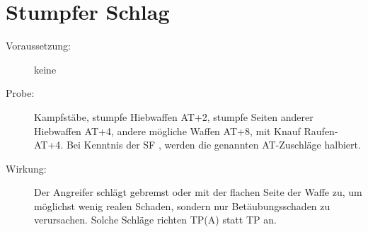 \section{Stumpfer Schlag}
\label{aktion.stumpfer_schlag}
\begin{description}
    \item[Voraussetzung:]
        keine
    \item[Probe:]
        Kampfstäbe, stumpfe Hiebwaffen AT+2, stumpfe Seiten anderer Hiebwaffen AT+4, andere mögliche Waffen AT+8, mit Knauf Raufen-AT+4.
        Bei Kenntnis der SF , werden die genannten AT-Zuschläge halbiert.
    \item[Wirkung:]
        Der Angreifer schlägt gebremst oder mit der flachen Seite der Waffe zu, um möglichst wenig realen Schaden, sondern nur Betäubungsschaden zu verursachen.
        Solche Schläge richten TP(A) statt TP an.
\end{description}
